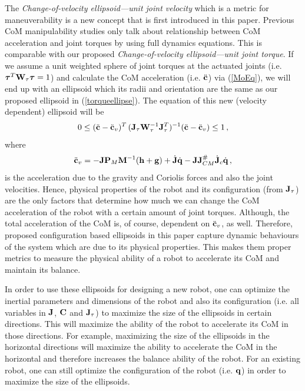 The \textit{Change-of-velocity ellipsoid---unit joint velocity} which is a
metric for maneuverability is a new concept that is first introduced in this
paper.  Previous CoM manipulability studies only talk about relationship
between CoM acceleration and joint torques by using full dynamics equations.
This is comparable with our proposed \textit{Change-of-velocity
  ellipsoid---unit joint torque}.  If we assume a unit weighted sphere of
joint torques at the actuated joints (i.e. $\boldsymbol{\tau}^T \mathbf{W}_\tau \boldsymbol{\tau} = 1$) and
calculate the CoM acceleration (i.e. $\ddot{\mathbf{c}}$) via (\ref{MoEq}), we will
end up with an ellipsoid which its radii and orientation are the same as our
proposed ellipsoid in (\ref{torqueellipse}).  The equation of this new
(velocity dependent) ellipsoid will be
%
\begin{equation}
    0 \leq (\ddot{\mathbf{c}} - \ddot{\mathbf{c}}_v)^T \, (\mathbf{J}_\tau \mathbf{W}_\tau^{-1}
    \mathbf{J}_\tau^T)^{-1} (\ddot{\mathbf{c}} - \ddot{\mathbf{c}}_v) \leq 1 \, ,
  \label{veldepellipsoid}
\end{equation}
%
where
%
\begin{equation}
  \ddot{\mathbf{c}}_v = -\mathbf{J} \mathbf{P}_M \mathbf{M}^{-1} (\mathbf{h}+\mathbf{g}) + \dot{\mathbf{J}} \dot{\mathbf{q}} - \mathbf{J}
  \mathbf{J}^\#_{CM} \dot{\mathbf{J}}_c \dot{\mathbf{q}} \, ,
  \label{cvddot}
\end{equation}
%
is the acceleration due to the gravity and Coriolis forces and also the joint
velocities.  Hence, physical properties of the robot and its configuration
(from $\mathbf{J}_\tau$) are the only factors that determine how much we can change
the CoM acceleration of the robot with a certain amount of joint torques.
Although, the total acceleration of the CoM is, of course, dependent on
$\ddot{\mathbf{c}}_v$, as well.  Therefore, proposed configuration based ellipsoids
in this paper capture dynamic behaviours of the system which are due to its
physical properties.  This makes them proper metrics to measure the physical
ability of a robot to accelerate its CoM and maintain its balance.

In order to use these ellipsoids for designing a new robot, one can optimize
the inertial parameters and dimensions of the robot and also its configuration
(i.e. all variables in $\mathbf{J}$, $\mathbf{C}$ and $\mathbf{J}_\tau$) to maximize the size of
the ellipsoids in certain directions.  This will maximize the ability of the
robot to accelerate its CoM in those directions.  For example, maximizing the
size of the ellipsoids in the horizontal directions will maximize the ability
to accelerate the CoM in the horizontal and therefore increases the balance
ability of the robot.  For an existing robot, one can still optimize the
configuration of the robot (i.e. $\mathbf{q}$) in order to maximize the size of the
ellipsoids.


